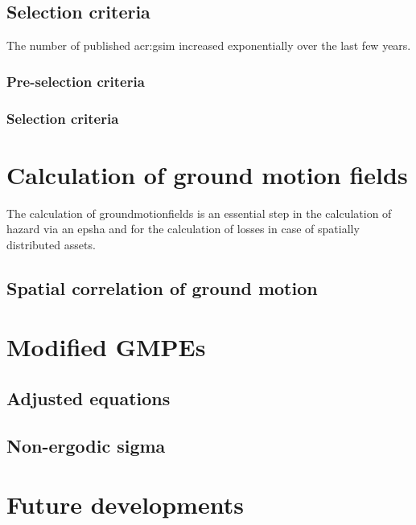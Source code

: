 \subsection{Selection criteria}
The number of published \gls{acr:gsim} increased exponentially over the last
few years.  
%
\subsubsection{Pre-selection criteria}
\cite{cotton2006} 

%
\subsubsection{Selection criteria}
%
%
\section{Calculation of ground motion fields}
%
The calculation of \glspl{groundmotionfield} is an essential step in the
calculation of hazard via an \gls{epsha} and for the calculation of losses 
in case of spatially distributed assets.
\subsection{Spatial correlation of ground motion}
%
\section{Modified GMPEs}
%
\subsection{Adjusted equations}
%
\subsection{Non-ergodic sigma}
%
\section{Future developments}
%
